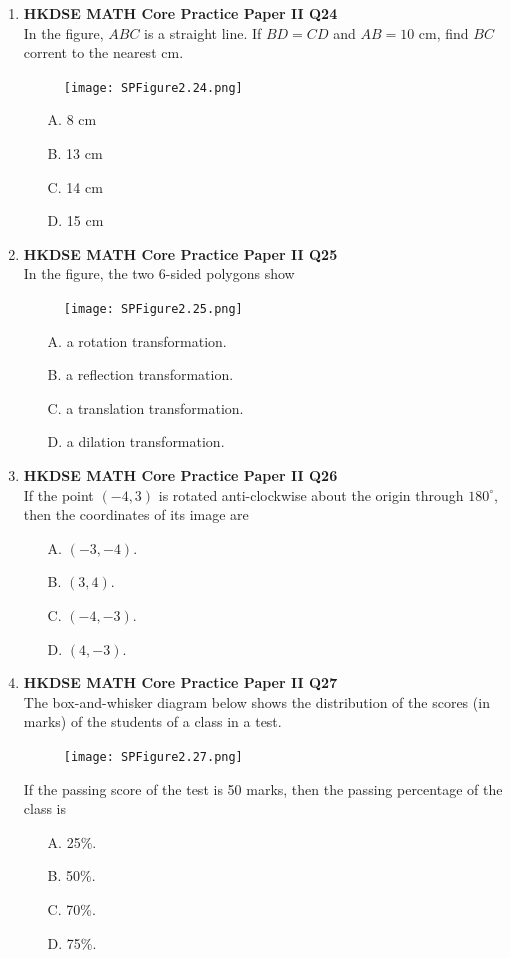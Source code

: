 \documentclass[12pt]{article}
\begin{document}
\begin{enumerate}
	\item \textbf{HKDSE MATH Core Practice Paper II Q24}\\
	In the figure, $ABC$ is a straight line. If $BD = CD$ and $AB = 10$ cm, find $BC$ corrent to the nearest cm.
	\begin{figure}[H]
		\centering
		\texttt{[image: SPFigure2.24.png]}	
	\end{figure}
	\begin{enumerate}
		\item[A.] 8 cm
		\item[B.] 13 cm
		\item[C.] 14 cm
		\item[D.] 15 cm
	\end{enumerate}

	\item \textbf{HKDSE MATH Core Practice Paper II Q25}\\
	In the figure, the two 6-sided polygons show
	\begin{figure}[H]
		\centering
		\texttt{[image: SPFigure2.25.png]}	
	\end{figure}
	\begin{enumerate}
		\item[A.] a rotation transformation.
		\item[B.] a reflection transformation.
		\item[C.] a translation transformation.
		\item[D.] a dilation transformation.
	\end{enumerate}
	
	\item \textbf{HKDSE MATH Core Practice Paper II Q26}\\
	If the point $(-4, 3)$ is rotated anti-clockwise about the origin through $180^\circ$, then the coordinates of its image are
	\begin{enumerate}
		\item[A.] $(-3, -4)$.
		\item[B.] $(3, 4)$.
		\item[C.] $(-4, -3)$.
		\item[D.] $(4, -3)$.
	\end{enumerate}
	
	\item \textbf{HKDSE MATH Core Practice Paper II Q27}\\
	The box-and-whisker diagram below shows the distribution of the scores (in marks) of the students of a class in a test.
	\begin{figure}[H]
		\centering
		\texttt{[image: SPFigure2.27.png]}	
	\end{figure}
	If the passing score of the test is 50 marks, then the passing percentage of the class is
	\begin{enumerate}
		\item[A.] 25\%.
		\item[B.] 50\%.
		\item[C.] 70\%.
		\item[D.] 75\%.
	\end{enumerate}
	

\end{enumerate}
\end{document}
